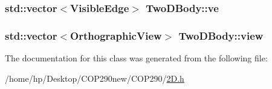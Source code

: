\subsubsection[{\texorpdfstring{ve}{ve}}]{\setlength{\rightskip}{0pt plus 5cm}std\+::vector$<${\bf Visible\+Edge}$>$ Two\+D\+Body\+::ve}\hypertarget{class_two_d_body_ac7b38febf4667a16f07ff25b35bd818d}{}\label{class_two_d_body_ac7b38febf4667a16f07ff25b35bd818d}
\subsubsection[{\texorpdfstring{view}{view}}]{\setlength{\rightskip}{0pt plus 5cm}std\+::vector$<${\bf Orthographic\+View}$>$ Two\+D\+Body\+::view}\hypertarget{class_two_d_body_ab3fca58e4b377854805f3149c5e1a96e}{}\label{class_two_d_body_ab3fca58e4b377854805f3149c5e1a96e}


The documentation for this class was generated from the following file\+:\begin{DoxyCompactItemize}
\item 
/home/hp/\+Desktop/\+C\+O\+P290new/\+C\+O\+P290/\hyperlink{2_d_8h}{2\+D.\+h}\end{DoxyCompactItemize}
